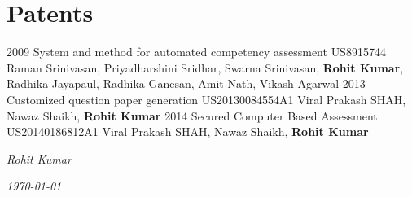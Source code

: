 \documentclass[]{cv-class}
\begin{document}
	\section{Patents}
	\begin{entrylist}
	\entry
	{2009}
	{System and method for automated competency assessment}
	{US8915744}
	{Raman Srinivasan, Priyadharshini Sridhar, Swarna Srinivasan, \textbf{Rohit Kumar}, Radhika Jayapaul, Radhika Ganesan, Amit Nath, Vikash Agarwal}
	\entry
	{2013}
	{Customized question paper generation}
	{US20130084554A1}
	{Viral Prakash SHAH, Nawaz Shaikh,\textbf{ Rohit Kumar}}
	\entry
	{2014}
	{Secured Computer Based Assessment}
	{US20140186812A1}
	{Viral Prakash SHAH, Nawaz Shaikh,\textbf{ Rohit Kumar}}
	\end{entrylist}

\vspace{1.5cm}
\begin{flushright}
\emph{Rohit Kumar}
\end{flushright}
\begin{flushright}
\emph{\today}
\end{flushright}
\end{document}
